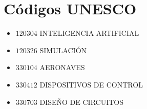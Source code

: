 \section*{Códigos UNESCO}
\begin{itemize}
	\item[] $120304$ \quad INTELIGENCIA ARTIFICIAL
	\item[] $120326$ \quad SIMULACIÓN
	\item[] $330104$ \quad AERONAVES
	\item[] $330412$ \quad DISPOSITIVOS DE CONTROL
	\item[] $330703$ \quad DISEÑO DE CIRCUITOS 


\end{itemize}
\newpage
\newpage